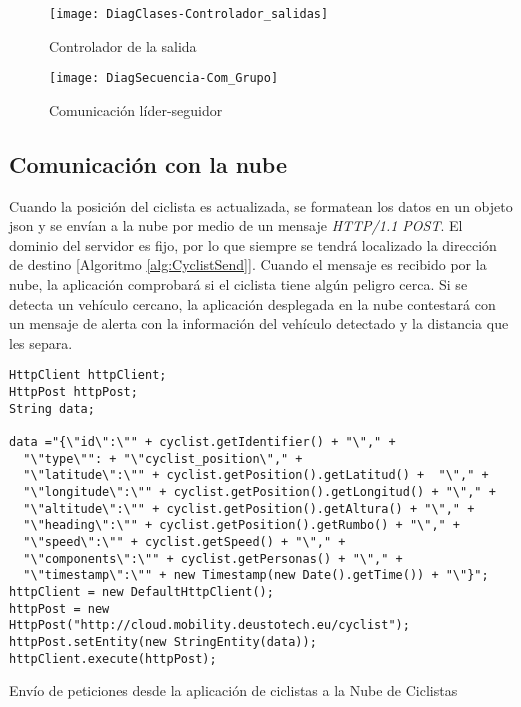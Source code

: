 \begin{figure}[H]
	\begin{center}
		\texttt{[image: DiagClases-Controlador\_salidas]}
		\caption{Controlador de la salida}
		\label{figure:DiagramController}
	\end{center}
\end{figure}

\begin{figure}[H]
	\begin{center}
		\texttt{[image: DiagSecuencia-Com\_Grupo]}
		\caption{Comunicación líder-seguidor}
		\label{figure:groupComm}
	\end{center}
\end{figure}

\subsection{Comunicación con la nube}\label{ssection:comunicacion_nube}
Cuando la posición del ciclista es actualizada, se formatean los datos en un objeto \gls{json} y se envían a la nube por medio de un mensaje \emph{HTTP/1.1 POST}. El dominio del servidor es fijo, por lo que siempre se tendrá localizado la dirección de destino [Algoritmo \ref{alg:CyclistSend}]. Cuando el mensaje es recibido por la nube, la aplicación comprobará si el ciclista tiene algún peligro cerca. Si se detecta un vehículo cercano, la aplicación desplegada en la nube contestará con un mensaje de alerta con la información del vehículo detectado y la distancia que les separa.

\begin{listing}
	\begin{minipage}{.4\textwidth}
		\begin{verbatim}
HttpClient httpClient;
HttpPost httpPost;
String data;

data ="{\"id\":\"" + cyclist.getIdentifier() + "\"," +
  "\"type\"": + "\"cyclist_position\"," +
  "\"latitude\":\"" + cyclist.getPosition().getLatitud() +  "\"," +
  "\"longitude\":\"" + cyclist.getPosition().getLongitud() + "\"," +
  "\"altitude\":\"" + cyclist.getPosition().getAltura() + "\"," +
  "\"heading\":\"" + cyclist.getPosition().getRumbo() + "\"," +
  "\"speed\":\"" + cyclist.getSpeed() + "\"," +
  "\"components\":\"" + cyclist.getPersonas() + "\"," +
  "\"timestamp\":\"" + new Timestamp(new Date().getTime()) + "\"}";
httpClient = new DefaultHttpClient();
httpPost = new HttpPost("http://cloud.mobility.deustotech.eu/cyclist");
httpPost.setEntity(new StringEntity(data));
httpClient.execute(httpPost);
		\end{verbatim}
	\end{minipage}
	\caption{Envío de peticiones desde la aplicación de ciclistas a la Nube de
	Ciclistas}\label{alg:CyclistSend}
\end{listing}

